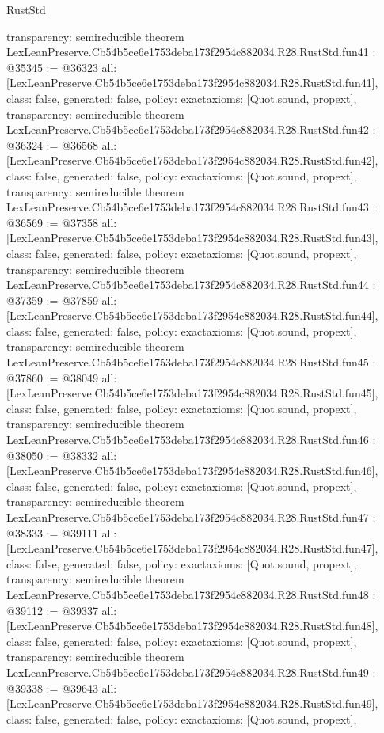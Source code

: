 \begin{lexlean}{RustStd}
\begin{coremodule}
{  transparency: semireducible
}
theorem LexLeanPreserve.Cb54b5ce6e1753deba173f2954c882034.R28.RustStd.fun41 : @35345 := @36323 {
  all: [LexLeanPreserve.Cb54b5ce6e1753deba173f2954c882034.R28.RustStd.fun41],
  class: false,
  generated: false,
  policy: exact{axioms: [Quot.sound, propext]},
  transparency: semireducible
}
theorem LexLeanPreserve.Cb54b5ce6e1753deba173f2954c882034.R28.RustStd.fun42 : @36324 := @36568 {
  all: [LexLeanPreserve.Cb54b5ce6e1753deba173f2954c882034.R28.RustStd.fun42],
  class: false,
  generated: false,
  policy: exact{axioms: [Quot.sound, propext]},
  transparency: semireducible
}
theorem LexLeanPreserve.Cb54b5ce6e1753deba173f2954c882034.R28.RustStd.fun43 : @36569 := @37358 {
  all: [LexLeanPreserve.Cb54b5ce6e1753deba173f2954c882034.R28.RustStd.fun43],
  class: false,
  generated: false,
  policy: exact{axioms: [Quot.sound, propext]},
  transparency: semireducible
}
theorem LexLeanPreserve.Cb54b5ce6e1753deba173f2954c882034.R28.RustStd.fun44 : @37359 := @37859 {
  all: [LexLeanPreserve.Cb54b5ce6e1753deba173f2954c882034.R28.RustStd.fun44],
  class: false,
  generated: false,
  policy: exact{axioms: [Quot.sound, propext]},
  transparency: semireducible
}
theorem LexLeanPreserve.Cb54b5ce6e1753deba173f2954c882034.R28.RustStd.fun45 : @37860 := @38049 {
  all: [LexLeanPreserve.Cb54b5ce6e1753deba173f2954c882034.R28.RustStd.fun45],
  class: false,
  generated: false,
  policy: exact{axioms: [Quot.sound, propext]},
  transparency: semireducible
}
theorem LexLeanPreserve.Cb54b5ce6e1753deba173f2954c882034.R28.RustStd.fun46 : @38050 := @38332 {
  all: [LexLeanPreserve.Cb54b5ce6e1753deba173f2954c882034.R28.RustStd.fun46],
  class: false,
  generated: false,
  policy: exact{axioms: [Quot.sound, propext]},
  transparency: semireducible
}
theorem LexLeanPreserve.Cb54b5ce6e1753deba173f2954c882034.R28.RustStd.fun47 : @38333 := @39111 {
  all: [LexLeanPreserve.Cb54b5ce6e1753deba173f2954c882034.R28.RustStd.fun47],
  class: false,
  generated: false,
  policy: exact{axioms: [Quot.sound, propext]},
  transparency: semireducible
}
theorem LexLeanPreserve.Cb54b5ce6e1753deba173f2954c882034.R28.RustStd.fun48 : @39112 := @39337 {
  all: [LexLeanPreserve.Cb54b5ce6e1753deba173f2954c882034.R28.RustStd.fun48],
  class: false,
  generated: false,
  policy: exact{axioms: [Quot.sound, propext]},
  transparency: semireducible
}
theorem LexLeanPreserve.Cb54b5ce6e1753deba173f2954c882034.R28.RustStd.fun49 : @39338 := @39643 {
  all: [LexLeanPreserve.Cb54b5ce6e1753deba173f2954c882034.R28.RustStd.fun49],
  class: false,
  generated: false,
  policy: exact{axioms: [Quot.sound, propext]},
}
\end{coremodule}
\end{lexlean}
